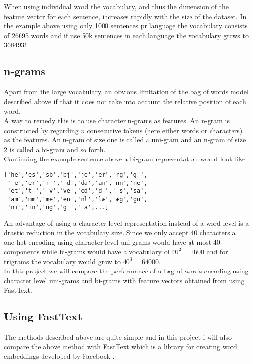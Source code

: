 When using individual word the vocabulary, and thus the dimension of the feature vector for each sentence, increases rapidly with the size of the dataset. In the example above using only 1000 sentences pr language the vocabulary consists of 26695 words and if use 50k sentences in each language the vocabulary grows to  368493!

\subsection{n-grams}

Apart from the large vocabulary, an obvious limitation of the bag of words model described above if that it does not take into account the relative position of each word.\\

A way to remedy this is to use character n-grams as features. An n-gram is constructed by regarding $n$ consecutive tokens (here either words or characters) as the features. An n-gram of size one is called a uni-gram and an n-gram of size 2 is called a bi-gram and so forth.\\

Continuing the example sentence above a bi-gram representation would look like

\begin{verbatim}
['he','es','sb','bj','je','er','rg','g ',
 ' e','er','r ',' d','da','an','nn','ne',
 'et','t ',' v','ve','ed','d ',' s','sa',
 'am','mm','me','en','nl','læ','æg','gn',
 'ni','in','ng','g ',' a',...]
\end{verbatim}

An advantage of using a character level representation instead of a word level is a drastic reduction in the vocabulary size. Since we only accept 40 characters a one-hot encoding using character level uni-grams would have at most 40 components while bi-grams would have a vocabulary of $40^2 = 1600$  and for trigrams the vocabulary would grow to  $40^3 = 64000$.\\

In this project we will compare the performance of a bag of words encoding using character level uni-grams and bi-grams with feature vectors obtained from using FastText.

\subsection{Using FastText}

The methods described above are quite simple and in this project i will also compare the above method with FastText which is a library for creating word embeddings developed by Facebook \cite{BagOfTricks}. \\

